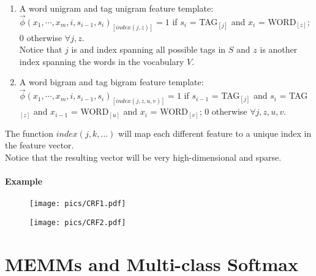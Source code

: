 \begin{enumerate}
  
 \item A word unigram and tag unigram feature template: $\vec{\phi}(x_1, \cdots, x_m, i, s_{i-1},s_i)_{[index(j,z)]}=1$ if $s_i$ = TAG$_{[j]}$ and $x_i$ = WORD$_{[z]}$; 0 otherwise $\forall j,z$. \\ Notice that $j$ is and index spanning all possible tags in $S$ and $z$ is another index spanning the words in the vocabulary $V$.
 
 \item A word bigram and tag bigram feature template: $\vec{\phi}(x_1, \cdots, x_m, i, s_{i-1},s_i)_{[index(j,z,u,v)]}=1$ if $s_{i-1}$ = TAG$_{[j]}$ and $s_i$ = TAG$_{[z]}$ and $x_{i-1}$ = WORD$_{[u]}$ and $x_{i}$ = WORD$_{[v]}$; 0 otherwise $\forall j,z,u,v$. 
 
 
\end{enumerate}

The function $index(j,k,...)$ will map each different feature to a unique index in the feature vector.  \\
Notice that the resulting vector will be very high-dimensional and sparse.

\paragraph{Example}
  \begin{figure}[h]
        	\texttt{[image: pics/CRF1.pdf]}
        \end{figure}

  \begin{figure}[h]
        	\texttt{[image: pics/CRF2.pdf]}
        \end{figure}





\section{MEMMs and Multi-class Softmax}

